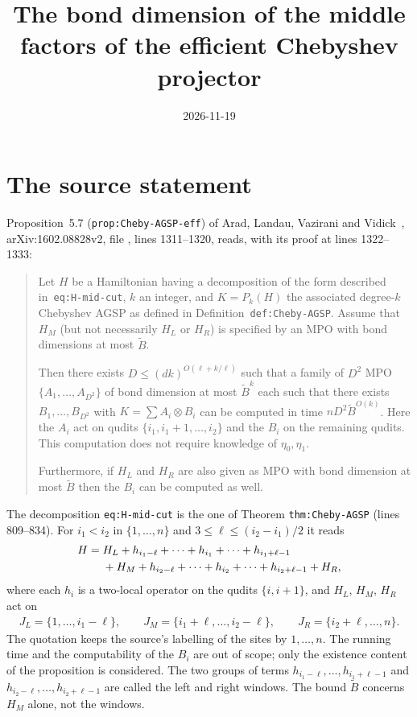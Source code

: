 \documentclass{article}
\title{The bond dimension of the middle factors of the efficient Chebyshev projector}
\author{}
\date{2026-11-19}
\begin{document}
\maketitle
{}

\section{The source statement}

Proposition~5.7 (\texttt{prop:Cheby-AGSP-eff}) of Arad, Landau, Vazirani and
Vidick~\cite{Arad2016RigorousRG}, arXiv:1602.08828v2, file
, lines 1311--1320, reads, with its proof at
lines 1322--1333:
\begin{quote}
Let $H$ be a Hamiltonian having a decomposition of the form described
in~\texttt{eq:H-mid-cut}, $k$ an integer, and $K = P_k(H)$ the associated
degree-$k$ Chebyshev AGSP as defined in Definition~\texttt{def:Cheby-AGSP}.
Assume that $H_M$ (but not necessarily $H_L$ or $H_R$) is specified by an MPO
with bond dimensions at most $\tilde{B}$.

Then there exists $D \leq (dk)^{O(\ell + k/\ell)}$ such that a family of $D^2$
MPO $\{A_1,\ldots,A_{D^2}\}$ of bond dimension at most $\tilde{B}^k$ each such
that there exists $B_1,\ldots,B_{D^2}$ with $K=\sum A_i\otimes B_i$ can be
computed in time $nD^2\tilde{B}^{O(k)}$. Here the $A_i$ act on qudits
$\{i_1,i_1+1,\ldots,i_2\}$ and the $B_i$ on the remaining qudits. This
computation does not require knowledge of $\eta_0,\eta_1$.

Furthermore, if $H_L$ and $H_R$ are also given as MPO with bond dimension at
most $\tilde{B}$ then the $B_i$ can be computed as well.
\end{quote}
The decomposition \texttt{eq:H-mid-cut} is the one of Theorem
\texttt{thm:Cheby-AGSP} (lines 809--834). For $i_1<i_2$ in $\{1,\ldots,n\}$
and $3\leq\ell\leq(i_2-i_1)/2$ it reads
\begin{align}
 H={}&H_L+h_{i_1-\ell}+\cdots+h_{i_1}+\cdots+h_{i_1+\ell-1}\notag\\
 &+H_M+h_{i_2-\ell}+\cdots+h_{i_2}+\cdots+h_{i_2+\ell-1}+H_R,
 \label{eq:alvv16_cmb_midcut}
\end{align}
where each $h_i$ is a two-local operator on the qudits $\{i,i+1\}$, and $H_L$,
$H_M$, $H_R$ act on
\begin{align}
 J_L=\{1,\ldots,i_1-\ell\},\qquad
 J_M=\{i_1+\ell,\ldots,i_2-\ell\},\qquad
 J_R=\{i_2+\ell,\ldots,n\}.
 \label{eq:alvv16_cmb_regions}
\end{align}
The quotation keeps the source's labelling of the sites by $1,\ldots,n$. The
running time and the computability of the $B_i$ are out of scope; only the
existence content of the proposition is considered. The two groups of terms
$h_{i_1-\ell},\ldots,h_{i_1+\ell-1}$ and $h_{i_2-\ell},\ldots,h_{i_2+\ell-1}$
are called the left and right windows. The bound $\tilde B$ concerns $H_M$
alone, not the windows.
\end{document}
